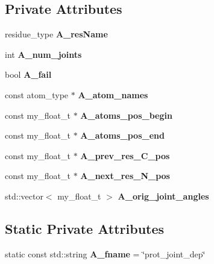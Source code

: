 \subsection*{Private Attributes}
\begin{CompactItemize}
\item 
residue\_\-type \textbf{A\_\-res\-Name}\label{classASCbase_1_1residue__joints_21497636be77aa78b659e24b4d60e350}

\item 
int \textbf{A\_\-num\_\-joints}\label{classASCbase_1_1residue__joints_bf4d7f0a200401c847a809f999ae2971}

\item 
bool \textbf{A\_\-fail}\label{classASCbase_1_1residue__joints_774042aeeddefb94221a85aef2a03eae}

\item 
const atom\_\-type $\ast$ \textbf{A\_\-atom\_\-names}\label{classASCbase_1_1residue__joints_5a33d4f7989653cd612fe8b6295e40a8}

\item 
const my\_\-float\_\-t $\ast$ \textbf{A\_\-atoms\_\-pos\_\-begin}\label{classASCbase_1_1residue__joints_36c3c3466b89a15fa509d32a83d97b9b}

\item 
const my\_\-float\_\-t $\ast$ \textbf{A\_\-atoms\_\-pos\_\-end}\label{classASCbase_1_1residue__joints_ae2d9bc7ca8ff776d6e1f46feb0c3f49}

\item 
const my\_\-float\_\-t $\ast$ \textbf{A\_\-prev\_\-res\_\-C\_\-pos}\label{classASCbase_1_1residue__joints_8fd8e62a05624a315c33809c1cf1bfb0}

\item 
const my\_\-float\_\-t $\ast$ \textbf{A\_\-next\_\-res\_\-N\_\-pos}\label{classASCbase_1_1residue__joints_c695ff8ec00bd34f913a43fe8087e7fa}

\item 
std::vector$<$ my\_\-float\_\-t $>$ \textbf{A\_\-orig\_\-joint\_\-angles}\label{classASCbase_1_1residue__joints_e0ccbfe40d2d00392c4d921188ad6361}

\end{CompactItemize}
\subsection*{Static Private Attributes}
\begin{CompactItemize}
\item 
static const std::string \textbf{A\_\-fname} = \char`\"{}prot\_\-joint\_\-dep\char`\"{}\label{classASCbase_1_1residue__joints_e39bf1e8f574aad44de1a4614d83a659}

\end{CompactItemize}


